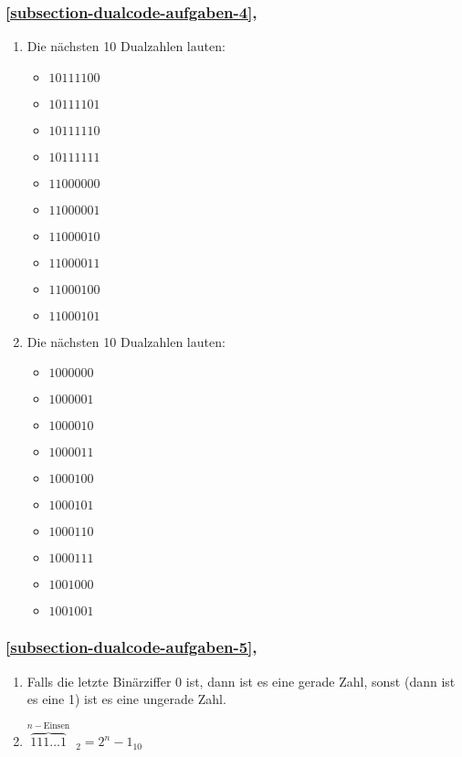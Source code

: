 \subsubsection{\autoref{subsection-dualcode-aufgaben-4}, }

\begin{multicols}{2}
\begin{enumerate}
\item Die nächsten \num{10} Dualzahlen lauten:
\begin{itemize}
\item $10111100$
\item $10111101$
\item $10111110$
\item $10111111$
\item $11000000$
\item $11000001$
\item $11000010$
\item $11000011$
\item $11000100$
\item $11000101$
\end{itemize}
\item Die nächsten \num{10} Dualzahlen lauten:
\begin{itemize}
\item $1000000$
\item $1000001$
\item $1000010$
\item $1000011$
\item $1000100$
\item $1000101$
\item $1000110$
\item $1000111$
\item $1001000$
\item $1001001$
\end{itemize}
\end{enumerate}
\end{multicols}

\subsubsection{\autoref{subsection-dualcode-aufgaben-5}, }

\begin{enumerate}
\item Falls die letzte Binärziffer \num{0} ist, dann ist es eine gerade Zahl, sonst (dann ist es eine \num{1}) ist es eine ungerade Zahl.
\item $\overbrace{111\dots1}^{n-\textrm{Einsen}}$~$_2 = 2^n-1_{10}$
\end{enumerate}

